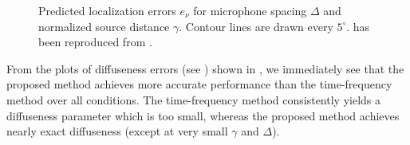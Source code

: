 \begin{figure}[t]
	\caption[Contour plots of localization errors for each interpolation method.]{
	Predicted localization errors $e_\nu$ for microphone spacing $\Delta$ and normalized source distance $\gamma$.
	Contour lines are drawn every $5^\circ$.
	 has been reproduced from .}
	\label{fig:09_Thiergart_Comparison:Localization_Errors}
\end{figure}


From the plots of diffuseness errors (see ) shown in , we immediately see that the proposed method achieves more accurate performance than the time-frequency method over all conditions.
The time-frequency method consistently yields a diffuseness parameter which is too small, whereas the proposed method achieves nearly exact diffuseness (except at very small $\gamma$ and $\Delta$).

